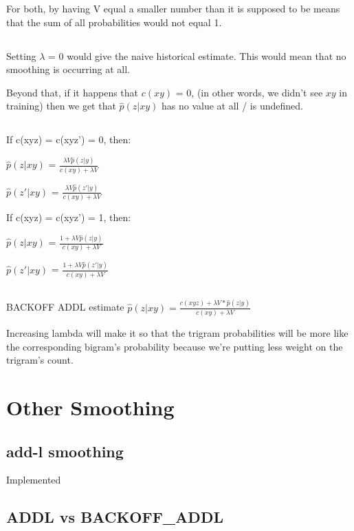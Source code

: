\documentclass[12pt, letterpaper]{article}
\begin{document}
For both, by having V equal a smaller number than it is supposed to be means that the sum of all probabilities would not equal 1. 

\subsection{}

Setting $\lambda$ = 0 would give the naive historical estimate. This would mean that no smoothing is occurring at all. 

Beyond that, if it happens that $c(xy)$ = 0, (in other words, we didn't see $xy$ in training) then we get that $\hat{p}(z|xy)$ has no value at all / is undefined.

\subsection{}

If c(xyz) = c(xyz') = 0, then:

$\hat{p}(z|xy)$ = $\frac{\lambda V \hat{p}(z|y)}{c(xy) + \lambda V}$

$\hat{p}(z'|xy)$ = $\frac{\lambda V \hat{p}(z'|y)}{c(xy) + \lambda V}$

If c(xyz) = c(xyz') = 1, then:

$\hat{p}(z|xy)$ = $\frac{1 + \lambda V \hat{p}(z|y)}{c(xy) + \lambda V}$

$\hat{p}(z'|xy)$ = $\frac{1 + \lambda V \hat{p}(z'|y)}{c(xy) + \lambda V}$

\subsection{}

BACKOFF ADDL estimate $\hat{p}(z | xy) = \frac{c(xyz) + \lambda V * \hat{p}(z|y)}{c(xy) + \lambda V}$

Increasing lambda will make it so that the trigram probabilities will be more like the corresponding bigram's probability because we're putting less weight on the trigram's count.

\section{Other Smoothing}
\subsection{add-l smoothing}
Implemented

\subsection{ADDL vs BACKOFF\_ADDL}
\end{document}
